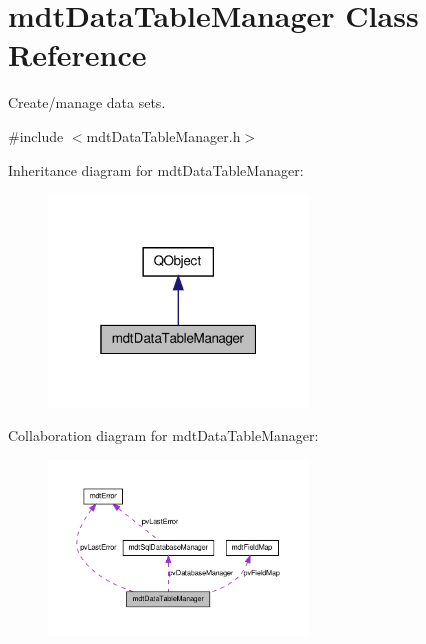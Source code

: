 \hypertarget{classmdt_data_table_manager}{\section{mdt\-Data\-Table\-Manager Class Reference}
\label{classmdt_data_table_manager}
}


Create/manage data sets.  




{\ttfamily \#include $<$mdt\-Data\-Table\-Manager.\-h$>$}



Inheritance diagram for mdt\-Data\-Table\-Manager\-:\nopagebreak
\begin{figure}[H]
\begin{center}
\leavevmode
\includegraphics[width=196pt]{classmdt_data_table_manager__inherit__graph}
\end{center}
\end{figure}


Collaboration diagram for mdt\-Data\-Table\-Manager\-:\nopagebreak
\begin{figure}[H]
\begin{center}
\leavevmode
\includegraphics[width=196pt]{classmdt_data_table_manager__coll__graph}
\end{center}
\end{figure}
